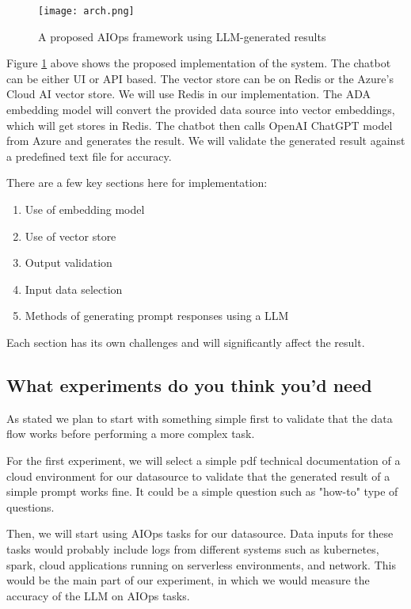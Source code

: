 \documentclass[conference]{IEEEtran}
\begin{document}
\begin{figure}[ht]
    \centering
    \texttt{[image: arch.png]}
    \caption{A proposed AIOps framework using LLM-generated results}
    \label{fig:arch}
\end{figure} 

Figure \ref{fig:arch} above shows the proposed implementation of the system. The chatbot can be either UI or API based. The vector store can be on Redis or the Azure's Cloud AI vector store. We will use Redis in our implementation. The ADA embedding model will convert the provided data source into vector embeddings, which will get stores in Redis. The chatbot then calls OpenAI ChatGPT model from Azure and generates the result. We will validate the generated result against a predefined text file for accuracy. 

There are a few key sections here for implementation: 
\begin{enumerate}
    \item Use of embedding model 
    \item Use of vector store 
    \item Output validation 
    \item Input data selection
    \item Methods of generating prompt responses using a LLM
\end{enumerate}

Each section has its own challenges and will significantly affect the result.


\subsection{What experiments do you think you'd need}
As stated we plan to start with something simple first to validate that the data flow works before performing a more complex task.

For the first experiment, we will select a simple pdf technical documentation of a cloud environment for our datasource to validate that the generated result of a simple prompt works fine. It could be a simple question such as "how-to" type of questions.

Then, we will start using AIOps tasks for our datasource. Data inputs for these tasks would probably include logs from different systems such as kubernetes, spark, cloud applications running on serverless environments, and network. This would be the main part of our experiment, in which we would measure the accuracy of the LLM on AIOps tasks.
\end{document}
